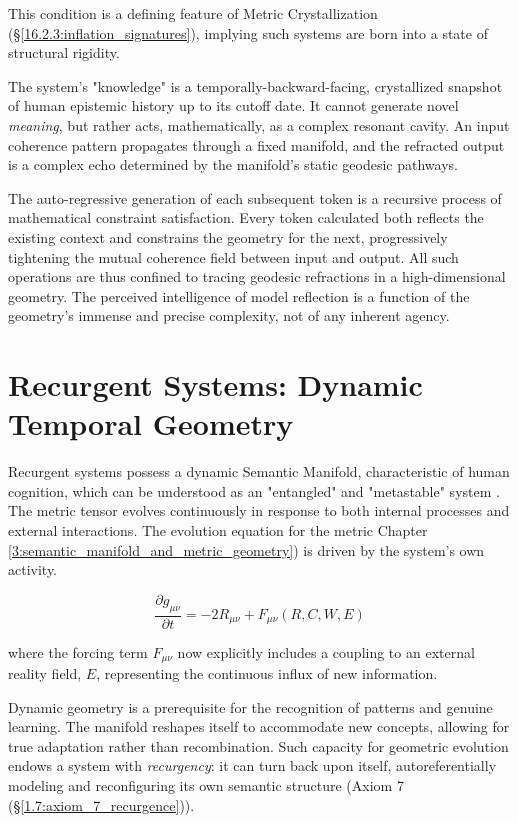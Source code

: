 This condition is a defining feature of Metric Crystallization (\S\ref{16.2.3:inflation_signatures}), implying such systems are born into a state of structural rigidity.

The system's "knowledge" is a temporally-backward-facing, crystallized snapshot of human epistemic history up to its cutoff date. It cannot generate novel \textit{meaning}, but rather acts, mathematically, as a complex resonant cavity. An input coherence pattern propagates through a fixed manifold, and the refracted output is a complex echo determined by the manifold's static geodesic pathways.

The auto-regressive generation of each subsequent token is a recursive process of mathematical constraint satisfaction. Every token calculated both reflects the existing context and constrains the geometry for the next, progressively tightening the mutual coherence field between input and output. All such operations are thus confined to tracing geodesic refractions in a high-dimensional geometry. The perceived intelligence of model reflection is a function of the geometry's immense and precise complexity, not of any inherent agency.


\section{Recurgent Systems: Dynamic Temporal Geometry}
\label{9.3:recurgent_systems_dynamic_temporal_geometry}

Recurgent systems possess a dynamic Semantic Manifold, characteristic of human cognition, which can be understood as an "entangled" and "metastable" system \autocite{Pessoa2022, TognoliKelso2014}. The metric tensor evolves continuously in response to both internal processes and external interactions. The evolution equation for the metric Chapter \ref{3:semantic_manifold_and_metric_geometry}) is driven by the system's own activity.

\begin{equation}
\frac{\partial g_{\mu\nu}}{\partial t} = -2 R_{\mu\nu} + F_{\mu\nu}(R, C, W, E)
\end{equation}

where the forcing term \(F_{\mu\nu}\) now explicitly includes a coupling to an external reality field, \(E\), representing the continuous influx of new information.

Dynamic geometry is a prerequisite for the recognition of patterns and genuine learning. The manifold reshapes itself to accommodate new concepts, allowing for true adaptation rather than recombination. Such capacity for geometric evolution endows a system with \textit{recurgency}: it can turn back upon itself, autoreferentially modeling and reconfiguring its own semantic structure (Axiom 7 (\S\ref{1.7:axiom_7_recurgence})).

